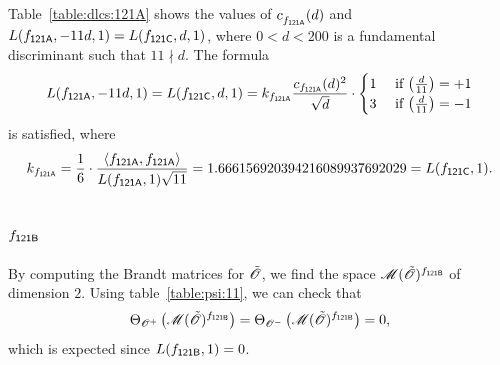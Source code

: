 Table~\ref{table:dlcs:121A} shows
the values of $c^{}_{f_\mathsf{{121A}}}(d)$
and $L(f_\mathsf{{121A}},-11d,1) = L(f_\mathsf{{121C}},d,1)$,
where $0<d<200$ is a fundamental discriminant
such that
$11\nmid d$.
The formula
\[
  L(\mf{121A},-11d,1) = L(\mf{121C},d,1)
  = k_{\mf{121A}} \frac{c_{\mf{121A}}(d)^2}{\sqrt{d}}
\cdot\begin{cases}
      1 & \text{ if $\kro{d}{11} = +1$} \\
      3 & \text{ if $\kro{d}{11} = -1$} \\
    \end{cases}
\]
is satisfied, where 
\[
  k_{\mf{121A}} = \frac{1}{6}\cdot
  \frac{\<\mf{121A},\mf{121A}>}
        {L(\mf{121A},1)\sqrt{11}}
  = 1.666156920394216089937692029  = L(\mf{121C},1).
\]
\subsection{$f_\mathsf{{121B}}$}
By computing the Brandt matrices for ${\tilde{{\mathscr{O}}}}$,
we find the space $\operatorname{{\mathscr M}}({\tilde{{\mathscr{O}}}})^{f_\mathsf{{121B}}}
$
of dimension $2$.
Using table~\ref{table:psi:11},
we can check that
\[
  {\Theta}_{{{\mathscr{O}}^+}}\left(\operatorname{{\mathscr M}}({\tilde{{\mathscr{O}}}})^{f_\mathsf{{121B}}}\right)  = 
  {\Theta}_{{{\mathscr{O}}^-}}\left(\operatorname{{\mathscr M}}({\tilde{{\mathscr{O}}}})^{f_\mathsf{{121B}}}\right)  = 0,
\]
which is expected since $L(f_\mathsf{{121B}},1)=0$.

